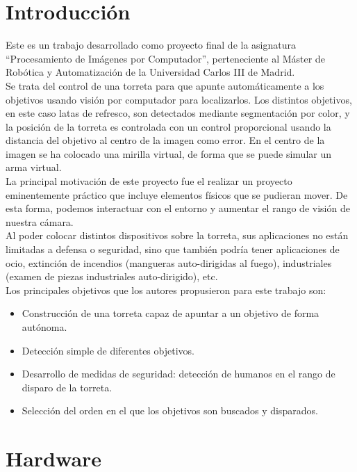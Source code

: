 \section{Introducción}
Este es un trabajo desarrollado como proyecto final de la asignatura “Procesamiento de Imágenes por Computador”, perteneciente al Máster de Robótica y Automatización de la Universidad Carlos III de Madrid.\\

Se trata del control de una torreta para que apunte automáticamente a los objetivos usando visión por computador para localizarlos. Los distintos objetivos, en este caso latas de refresco, son detectados mediante segmentación por color, y la posición de la torreta es controlada con un control proporcional usando la distancia del objetivo al centro de la imagen como error. En el centro de la imagen se ha colocado una mirilla virtual, de forma que se puede simular un arma virtual.\\

La principal motivación de este proyecto fue el realizar un proyecto eminentemente práctico que incluye elementos físicos que se pudieran mover. De esta forma, podemos interactuar con el entorno y aumentar el rango de visión de nuestra cámara.\\

Al poder colocar distintos dispositivos sobre la torreta, sus aplicaciones no están limitadas a defensa o seguridad, sino que también podría tener aplicaciones de ocio, extinción de incendios (mangueras auto-dirigidas al fuego), industriales (examen de piezas industriales auto-dirigido), etc.\\

Los principales objetivos que los autores propusieron para este trabajo son:
\begin{itemize}
\item Construcción de una torreta capaz de apuntar a un objetivo de forma autónoma.
\item Detección simple de diferentes objetivos.
\item Desarrollo de medidas de seguridad: detección de humanos en el rango de disparo de la torreta.
\item Selección del orden en el que los objetivos son buscados y disparados.
\end{itemize}

\newpage

\section{Hardware}

